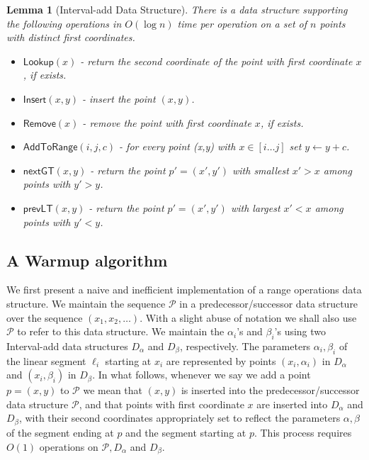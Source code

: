 \documentclass[10pt,a4paper]{article}
\newtheorem{lemma}[theorem]{Lemma}
\newcommand{\AtR}{\mathsf{AddToRange}}
\newcommand{\assign}{\leftarrow}
\newcommand{\Insert}{\mathsf{Insert}}
\newcommand{\Remove}{\mathsf{Remove}}
\newcommand{\Lookup}{\mathsf{Lookup}}
\newcommand{\nextGT}{\mathsf{nextGT}}
\newcommand{\prevLT}{\mathsf{prevLT}}
\renewcommand{\P}{\mathcal{P}}
\begin{document}
\begin{lemma}[Interval-add Data Structure]\label{l:IntervalAdd}
    There is a data structure supporting the following operations in $O(\log n)$ time per operation on a set of $n$ points with distinct first coordinates.
    \begin{itemize}
         \item $\Lookup(x)$ - return the second coordinate of the point with first coordinate $x$, if exists.
        \item $\Insert(x,y)$ - insert the point $(x,y)$.
        \item $\Remove(x)$ - remove the point with first coordinate $x$, if exists.
        \item $\AtR(i,j,c)$ - for every point (x,y) with $x\in[i\ldots j]$ set $y\assign y+c$. 
        \item $\nextGT(x,y)$ -\! return the point $p'=(x',y')$ with smallest $x'>x$ among points with $y'>y$.
        \item $\prevLT(x,y)$ - return the point $p'=(x',y')$ with largest $x'<x$ among points with $y'<y$. 
    \end{itemize}
\end{lemma}

\subsection{A Warmup algorithm}\label{sec:warmup}
We first present a naive and inefficient implementation of a range operations data structure.  
We maintain the sequence $\P$ in a predecessor/successor data structure over the sequence $(x_1, x_2, \ldots)$. With a slight abuse of notation we shall also use $\P$ to refer to this data structure. We maintain the $\alpha_i$'s and $\beta_i$'s using two Interval-add data structures $D_{\alpha}$ and $D_\beta$, respectively. 
The parameters $\alpha_i, \beta_i$ of the linear segment $\ell_i$ starting at $x_i$ are represented by points $(x_i,\alpha_i)$ in $D_\alpha$ and $(x_i, \beta_i)$ in $D_\beta$. In what follows, whenever we say we add a point $p=(x,y)$ to $\P$ we mean that $(x,y)$ is inserted into the predecessor/successor data structure $\P$, and that points with first coordinate $x$ are inserted into $D_\alpha$ and $D_\beta$, with their second coordinates appropriately set to reflect the parameters $\alpha,\beta$ of the segment ending at $p$ and the segment starting at $p$. This process requires $O(1)$ operations on $\P,D_\alpha$ and $D_\beta$. 
 
\end{document}
